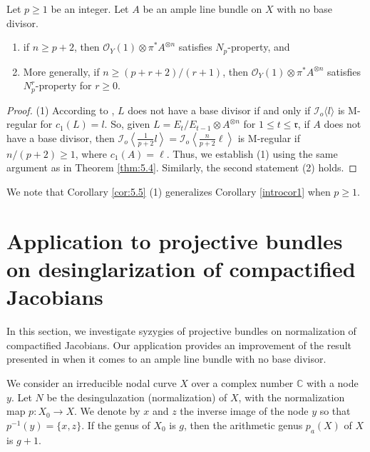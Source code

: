\documentclass[11pt,letter]{amsart}
\numberwithin{equation}{section}
\begin{document}
\begin{cor}\label{cor:5.5}
Let $p\geq 1$ be an integer. Let $A$ be an ample line bundle on $X$ with no base divisor. 
\begin{enumerate}
\item if $n\geq p+2$, then $\mathcal{O}_Y(1)\otimes\pi^*A^{\otimes n}$ satisfies $N_p$-property, and
\item More generally, if $n\geq (p+r+2)/(r+1)$, then $\mathcal{O}_Y(1)\otimes\pi^*A^{\otimes n}$ satisfies $N_p^r$-property for $r\geq 0$. 
\end{enumerate}
\end{cor}
\begin{proof}
(1) According to \cite[Remark 3.6]{PP04}, $L$ does not have a base divisor if and only if $\mathcal{I}_o\langle l\rangle$ is M-regular for $c_1(L)=l$. So, given $L=E_t/E_{t-1}\otimes A^{\otimes n}$ for $1\leq t\leq \mathfrak{r}$, if $A$ does not have a base divisor, then $\mathcal{I}_o\left\langle\frac{1}{p+2}l\right\rangle=\mathcal{I}_o\left\langle\frac{n}{p+2}\ell\right\rangle$ is M-regular if ${n}/({p+2})\geq 1$, where $c_1(A)=\ell$. Thus, we establish (1) using the same argument as in Theorem \ref{thm:5.4}. Similarly, the second statement (2) holds.
\end{proof}

We note that Corollary \ref{cor:5.5} (1) generalizes Corollary \ref{introcor1} when $p\geq 1$.



\section{Application to projective bundles on desinglarization of compactified Jacobians}\label{sec5}


In this section, we investigate syzygies of projective bundles on normalization of compactified Jacobians. Our application provides an improvement of the result presented in \cite[Theorem 5.4]{Chi19} when it comes to an ample line bundle with no base divisor. 

We consider an irreducible nodal curve $X$ over a complex number $\mathbb{C}$ with a node $y$. Let $N$ be the desingulazation (normalization) of $X$, with the normalization map $p:X_0\rightarrow X$. We denote by $x$ and $z$ the inverse image of the node $y$ so that $p^{-1}(y)=\{x,z\}$. If the genus of $X_0$ is $g$, then the arithmetic genus $p_a(X)$ of $X$ is $g+1$. 
\end{document}
